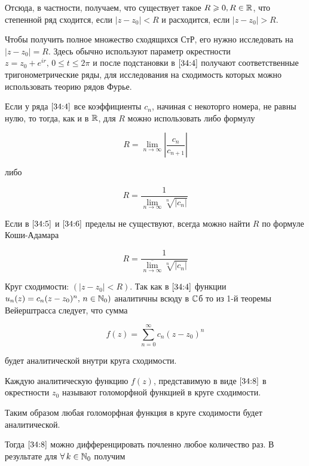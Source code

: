 \documentclass[../../main.tex]{subfiles}
\begin{document}
Отсюда, в частности, получаем, что существует такое $ R \geqslant 0, R \in \mathbb{R} $, что степенной ряд сходится, если $ |z - z_0| < R $ и расходится, если $ |z - z_0| > R $.

Чтобы получить полное множество сходящихся СтР, его нужно исследовать на $ |z - z_0| = R $. Здесь обычно используют параметр окрестности $ z = z_0 + e^{ir},\, 0 \leq t \leq 2\pi $ и после подстановки в $ \eqref{34:4} $ получают соответственные тригонометрические ряды, для исследования на сходимость которых можно использовать теорию рядов Фурье.

Если у ряда $ \eqref{34:4} $ все коэффициенты $ c_n $, начиная с некоторго номера, не равны нулю, то тогда, как и в $ \mathbb{R} $, для $R$ можно использовать либо формулу

\begin{equation}\label{34:5}
	R = \underset{n \to \infty}{\lim} |\frac{c_n}{c_{n+1}}|
\end{equation}

либо

\begin{equation}\label{34:6}
	R = \frac{1}{\underset{n \to \infty}{\lim} \sqrt[n]{|c_n|}}
\end{equation}

Если в $ \eqref{34:5} $ и $ \eqref{34:6} $ пределы не существуют, всегда можно найти $R$ по формуле Коши-Адамара

\begin{equation}\label{34:7}
	R = \frac{1}{\overline{\underset{n \to \infty}{\lim}} \sqrt[n]{|c_n|}}
\end{equation}

Круг сходимости: $ (|z - z_0| < R) $. Так как в $ \eqref{34:4} $ функции $ u_n(z) = c_n(z - z_0)^n,\, n \in \mathbb{N}_0) $ аналитичны всюду в $ \mathbb{C} $б то из 1-й теоремы Вейерштрасса следует, что сумма

\begin{equation}\label{34:8}
	f(z) = \sum\limits_{n = 0}^{\infty} c_n(z - z_0)^n
\end{equation}

будет аналитической внутри круга сходимости.

Каждую аналитическую функцию $ f(z) $, представимую в виде $ \eqref{34:8} $ в окрестности $z_0$ называют голоморфной функцией в круге сходимости.

Таким образом любая голоморфная функция в круге сходимости будет аналитической.

Тогда $ \eqref{34:8} $ можно дифференцировать почленно любое количество раз. В результате для $ \forall\, k \in \mathbb{N}_0 $ получим
\end{document}
